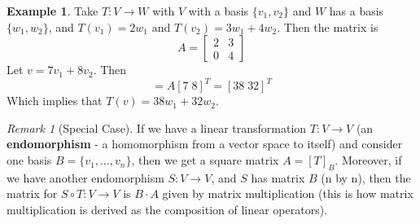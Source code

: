 \documentclass[12pt]{article}
\theoremstyle{definition}
\newtheorem{eg}[thm]{Example}
\theoremstyle{remark}
\newtheorem{rmk}[thm]{Remark}
\numberwithin{equation}{section}
\newcommand\B[1]{\textbf{ #1}}
\begin{document}
\begin{figure}[H]
        \centering
\end{figure}


\vspace{15pt}

\begin{eg}
        Take $T: V \rightarrow W$ with $V$ with a basis $\{v_1,v_2\}$ and $W$ has a basis $\{w_1,w_2\}$, and $T(v_1) = 2w_1$ and $T(v_2) = 3w_1+4w_2$. Then the matrix is \begin{equation}
                A = \begin{bmatrix} 2 & 3 \\ 0 & 4 \end{bmatrix}
        \end{equation}
        Let $v = 7v_1 + 8v_2$. Then \begin{equation}
                [T(v)] = A[7 \; 8 ]^T = [38 \; 32]^T
        \end{equation}
        Which implies that $T(v) = 38w_1+32w_2$.
\end{eg}

\vspace{15pt}


\begin{rmk}[Special Case]
        If we have a linear transformation $T:V\rightarrow V$ (an \B{endomorphism} - a homomorphism from a vector space to itself) and consider one basis $B= \{v_1,...,v_n\}$, then we get a square matrix $A = [T]_B$. Moreover, if we have another endomorphism $S:V\rightarrow V$, and $S$ has matrix $B$ (n by n), then the matrix for $S\circ T:V\rightarrow V$ is $B\cdot A$ given by matrix multiplication (this is how matrix multiplication is derived as the composition of linear operators). 
\end{rmk}
\end{document}
